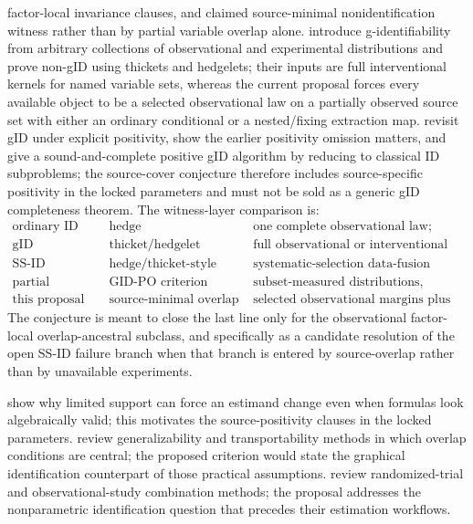 \documentclass[11pt]{article}
\theoremstyle{definition}
\theoremstyle{plain}
\theoremstyle{remark}
\begin{document}
factor-local invariance clauses, and claimed source-minimal nonidentification
witness rather than by partial variable overlap alone.
\citet{LeeCorreaBareinboim2020GID} introduce g-identifiability from arbitrary
collections of observational and experimental distributions and prove
non-gID using thickets and hedgelets; their inputs are full interventional
kernels for named variable sets, whereas the current proposal forces every
available object to be a selected observational law on a partially observed
source set with either an ordinary conditional or a nested/fixing extraction
map.  \citet{KivvaMokhtarianEtesamiKiyavash2022RevisitGID} revisit gID
under explicit positivity, show the earlier positivity omission matters, and
give a sound-and-complete positive gID algorithm by reducing to classical ID
subproblems; the source-cover conjecture therefore includes source-specific
positivity in the locked parameters and must not be sold as a generic gID
completeness theorem.  The witness-layer comparison is:
\[
\begin{array}{lll}
\text{ordinary ID} & \text{hedge} &
  \text{one complete observational law;}\\
\text{gID} & \text{thicket/hedgelet} &
  \text{full observational or interventional kernels;}\\
\text{SS-ID} & \text{hedge/thicket-style failure certificates} &
  \text{systematic-selection data-fusion inputs, with one failure case open;}\\
\text{partial observability} & \text{GID-PO criterion} &
  \text{subset-measured distributions, sufficient criterion, conditional NP-completeness;}\\
\text{this proposal} & \text{source-minimal overlap hedge} &
  \text{selected observational margins plus typed factor-local invariance clauses.}
\end{array}
\]
The conjecture is meant to close the last line only for the observational
factor-local overlap-ancestral subclass, and specifically as a candidate
resolution of the open SS-ID failure branch when that branch is entered by
source-overlap rather than by unavailable experiments.

\citet{CrumpHotzImbensMitnik2006Overlap} show why limited support can force
an estimand change even when formulas look algebraically valid; this motivates
the source-positivity clauses in the locked parameters.  \citet{DegtiarRose2023Generalizability}
review generalizability and transportability methods in which overlap
conditions are central; the proposed criterion would state the graphical
identification counterpart of those practical assumptions.  \citet{ColnetEtAl2024RCTObservationalReview}
review randomized-trial and observational-study combination methods; the
proposal addresses the nonparametric identification question that precedes
their estimation workflows.
\end{document}
